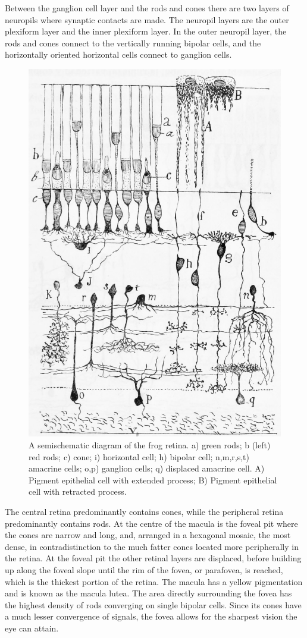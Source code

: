Between the ganglion cell layer and the rods and cones there are two layers of neuropils where synaptic contacts are made. The neuropil layers are the outer plexiform layer and the inner plexiform layer. In the outer neuropil layer, the rods and cones connect to the vertically running bipolar cells, and the horizontally oriented horizontal cells connect to ganglion cells.



\begin{figure}

{\centering \includegraphics[width=0.7\linewidth]{./figures/visual/FrogRetinaCajalManual} 

}

\caption{A semischematic diagram of the frog retina. a) green rods; b (left) red rods; c) cone; i) horizontal cell; h) bipolar cell; n,m,r,s,t) amacrine cells; o,p) ganglion cells; q) displaced amacrine cell. A) Pigment epithelial cell with extended process; B) Pigment epithelial cell with retracted process.}\label{fig:frogretina}
\end{figure}

The central retina predominantly contains cones, while the peripheral retina predominantly contains rods. At the centre of the macula is the foveal pit where the cones are narrow and long, and, arranged in a hexagonal mosaic, the most dense, in contradistinction to the much fatter cones located more peripherally in the retina. At the foveal pit the other retinal layers are displaced, before building up along the foveal slope until the rim of the fovea, or parafovea, is reached, which is the thickest portion of the retina. The macula has a yellow pigmentation and is known as the macula lutea. The area directly surrounding the fovea has the highest density of rods converging on single bipolar cells. Since its cones have a much lesser convergence of signals, the fovea allows for the sharpest vision the eye can attain.

